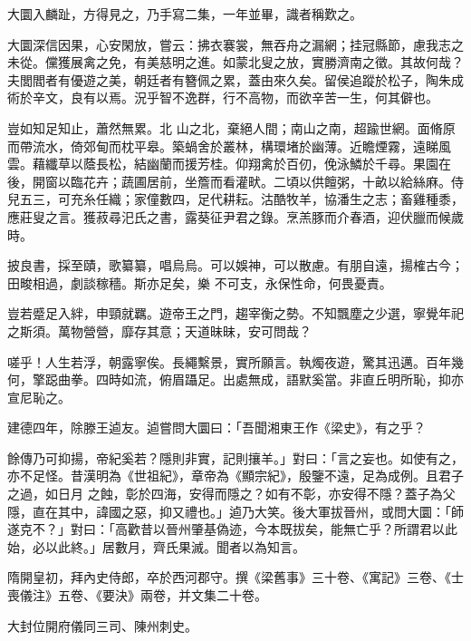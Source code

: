 \begin{pinyinscope}
 大圜入麟趾，方得見之，乃手寫二集，一年並畢，識者稱歎之。



 大圜深信因果，心安閑放，嘗云：拂衣褰裳，無吞舟之漏網；挂冠縣節，慮我志之未從。儻獲展禽之免，有美慈明之進。如蒙北叟之放，實勝濟南之徵。其故何哉？夫閭閻者有優遊之美，朝廷者有簪佩之累，蓋由來久矣。留侯追蹤於松子，陶朱成術於辛文，良有以焉。況乎智不逸群，行不高物，而欲辛苦一生，何其僻也。



 豈如知足知止，蕭然無累。北
 山之北，棄絕人間；南山之南，超踰世網。面脩原而帶流水，倚郊甸而枕平皋。築蝸舍於叢林，構環堵於幽薄。近瞻煙霧，遠睇風雲。藉纖草以蔭長松，結幽蘭而援芳桂。仰翔禽於百仞，俛泳鱗於千尋。果園在後，開窗以臨花卉；蔬圃居前，坐簷而看灌畎。二頃以供饘粥，十畝以給絲麻。侍兒五三，可充糸任織；家僮數四，足代耕耘。沽酷牧羊，協潘生之志；畜雞種黍，應莊叟之言。獲菽尋汜氏之書，露葵征尹君之錄。烹羔豚而介春酒，迎伏臘而候歲時。



 披良書，採至賾，歌纂纂，唱烏烏。可以娛神，可以散慮。有朋自遠，揚榷古今；田畯相過，劇談稼穡。斯亦足矣，樂
 不可支，永保性命，何畏憂責。



 豈若蹙足入絆，申頸就羈。遊帝王之門，趨宰衡之勢。不知飄塵之少選，寧覺年祀之斯須。萬物營營，靡存其意；天道昧昧，安可問哉？



 嗟乎！人生若浮，朝露寧俟。長繩繫景，實所願言。執燭夜遊，驚其迅邁。百年幾何，擎跽曲拳。四時如流，俯眉躡足。出處無成，語默奚當。非直丘明所恥，抑亦宣尼恥之。



 建德四年，除滕王逌友。逌嘗問大圜曰：「吾聞湘東王作《梁史》，有之乎？



 餘傳乃可抑揚，帝紀奚若？隱則非實，記則攘羊。」對曰：「言之妄也。如使有之，亦不足怪。昔漢明為《世祖紀》，章帝為《顯宗紀》，殷鑒不遠，足為成例。且君子之過，如日月
 之蝕，彰於四海，安得而隱之？如有不彰，亦安得不隱？蓋子為父隱，直在其中，諱國之惡，抑又禮也。」逌乃大笑。後大軍拔晉州，或問大圜：「師遂克不？」對曰：「高歡昔以晉州肇基偽迹，今本既拔矣，能無亡乎？所謂君以此始，必以此終。」居數月，齊氏果滅。聞者以為知言。



 隋開皇初，拜內史侍郎，卒於西河郡守。撰《梁舊事》三十卷、《寓記》三卷、《士喪儀注》五卷、《要決》兩卷，并文集二十卷。



 大封位開府儀同三司、陳州刺史。




\end{pinyinscope}

